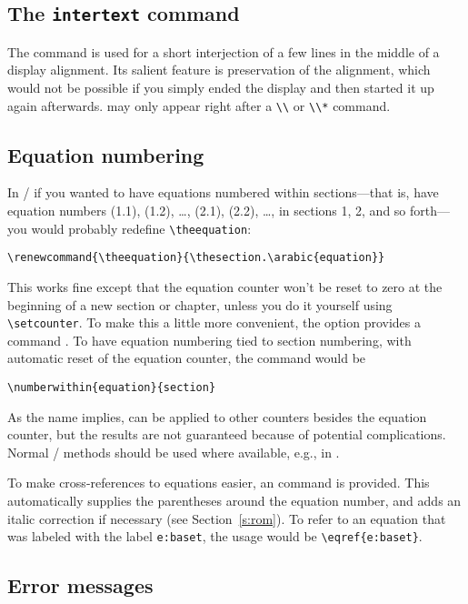 \subsection{The {\tt\bslash intertext} command} The command 
is used for a short interjection of a few lines in the middle of a
display alignment.  Its salient feature is preservation of the
alignment, which would not be possible if you simply ended the display
and then started it up again afterwards.  may only appear
right after a \verb"\\" or \verb"\\*" command.

\subsection{Equation numbering}

In \latex/ if you wanted to have equations numbered within
sections---that is, have
equation numbers (1.1), (1.2), \dots, (2.1), (2.2),
\dots, in sections 1, 2, and so forth---you would probably redefine
\verb"\theequation":  \begin{verbatim}
\renewcommand{\theequation}{\thesection.\arabic{equation}}
\end{verbatim}
This works fine except that the equation counter won't be reset to
zero at the beginning of a new section or chapter, unless you do it
yourself using \verb"\setcounter".  To make this a little more
convenient, the  option provides a command
.  To have equation numbering tied to section
numbering, with automatic reset of the equation counter,
the command would be
\begin{verbatim}
\numberwithin{equation}{section}
\end{verbatim}
As the name implies,  can be applied to other
counters besides the equation counter, but the results are not
guaranteed because of potential complications.  Normal \latex/ methods
should be used where available, e.g., in .

To make cross-references to equations easier, an 
command is provided.  This automatically supplies the parentheses
around the equation number, and adds an italic correction if necessary
(see Section~\ref{s:rom}).  To refer to an equation that
was labeled with the label {\tt e:baset}, the usage would be
\verb=\eqref{e:baset}=.

\subsection{Error messages}

